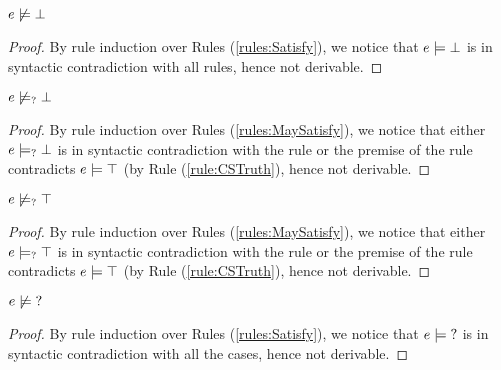 \begin{lemma}
  \label{lem:no-e-satisfy-falsity}
  $e \not\models \bot$
\end{lemma}
\begin{proof}
  By rule induction over Rules (\ref{rules:Satisfy}), we notice that $e \models \bot$ is in syntactic contradiction with all rules, hence not derivable.
\end{proof}

\begin{lemma}
  \label{lem:no-e-may-satisfy-falsity}
  $e \not\models_{?} \bot$
\end{lemma}
\begin{proof}
  By rule induction over Rules (\ref{rules:MaySatisfy}), we notice that either $e \models_{?} \bot$ is in syntactic contradiction with the rule or the premise of the rule contradicts $e \models \top$ (by Rule (\ref{rule:CSTruth}), hence not derivable.
\end{proof}

\begin{lemma}
  \label{lem:no-e-may-satisfy-truth}
  $e \not\models_{?} \top$
\end{lemma}
\begin{proof}
  By rule induction over Rules (\ref{rules:MaySatisfy}), we notice that either $e \models_{?} \top$ is in syntactic contradiction with the rule or the premise of the rule contradicts $e \models \top$ (by Rule (\ref{rule:CSTruth}), hence not derivable.
\end{proof}

\begin{lemma}
  \label{lem:no-e-satisfy-unknown}
  $e \not\models \mathtt{?}$
\end{lemma}
\begin{proof}
  By rule induction over Rules (\ref{rules:Satisfy}), we notice that $e \models \mathtt{?}$ is in syntactic contradiction with all the cases, hence not derivable.
\end{proof}

